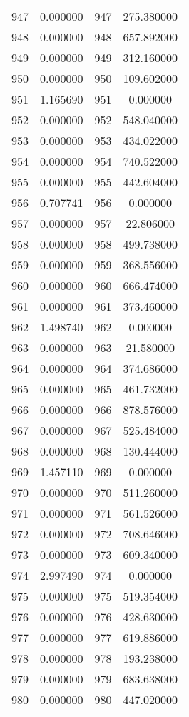 \documentclass[12pt]{article}
\begin{document}
\begin{longtable}{@{}cccc@{}}
947 & 0.000000 & 947 & 275.380000 \\
948 & 0.000000 & 948 & 657.892000 \\
949 & 0.000000 & 949 & 312.160000 \\
950 & 0.000000 & 950 & 109.602000 \\
951 & 1.165690 & 951 & 0.000000 \\
952 & 0.000000 & 952 & 548.040000 \\
953 & 0.000000 & 953 & 434.022000 \\
954 & 0.000000 & 954 & 740.522000 \\
955 & 0.000000 & 955 & 442.604000 \\
956 & 0.707741 & 956 & 0.000000 \\
957 & 0.000000 & 957 & 22.806000 \\
958 & 0.000000 & 958 & 499.738000 \\
959 & 0.000000 & 959 & 368.556000 \\
960 & 0.000000 & 960 & 666.474000 \\
961 & 0.000000 & 961 & 373.460000 \\
962 & 1.498740 & 962 & 0.000000 \\
963 & 0.000000 & 963 & 21.580000 \\
964 & 0.000000 & 964 & 374.686000 \\
965 & 0.000000 & 965 & 461.732000 \\
966 & 0.000000 & 966 & 878.576000 \\
967 & 0.000000 & 967 & 525.484000 \\
968 & 0.000000 & 968 & 130.444000 \\
969 & 1.457110 & 969 & 0.000000 \\
970 & 0.000000 & 970 & 511.260000 \\
971 & 0.000000 & 971 & 561.526000 \\
972 & 0.000000 & 972 & 708.646000 \\
973 & 0.000000 & 973 & 609.340000 \\
974 & 2.997490 & 974 & 0.000000 \\
975 & 0.000000 & 975 & 519.354000 \\
976 & 0.000000 & 976 & 428.630000 \\
977 & 0.000000 & 977 & 619.886000 \\
978 & 0.000000 & 978 & 193.238000 \\
979 & 0.000000 & 979 & 683.638000 \\
980 & 0.000000 & 980 & 447.020000 \\

\end{longtable}
\end{document}
